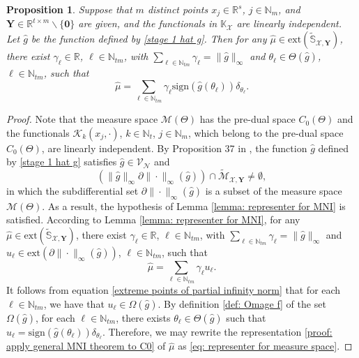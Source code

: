 \documentclass[11pt]{article}
\newtheorem{proposition}[theorem]{Proposition}
\begin{document}
\begin{proposition}\label{prop: representer theorem for MNI  in measure space}
Suppose that $m$ distinct points $x_j\in\mathbb{R}^s$, $j\in\mathbb{N}_m$, and $\mathbf{Y}\in\mathbb{R}^{t\times m}\backslash\{\mathbf{0}\}$ are given, and the functionals in $\mathbb{K}_\mathcal{X}$ are linearly independent. 
%
Let $\hat g$ be the function defined by \eqref{stage 1 hat g}. Then for any $\hat \mu\in\mathrm{ext}\left(\widetilde{\mathbb{S}}_{\mathcal{X},\mathbf{Y}}\right)$, there exist $\gamma_\ell\in\mathbb{R}$, $\ell\in\mathbb{N}_{tm}$, with  $\sum_{\ell\in\mathbb{N}_{tm}}\gamma_\ell=\|\hat g\|_{\infty}$ and $\theta_\ell\in\Theta(\hat g)$, $\ell\in\mathbb{N}_{tm}$, such that 
    \begin{equation}\label{eq: representer for measure space}
        \hat\mu=\sum\limits_{\ell\in\mathbb{N}_{tm}}\gamma_\ell\mathrm{sign}(\hat g(\theta_\ell))\delta_{\theta_\ell}.
    \end{equation}
\end{proposition}
\begin{proof}
Note that the measure space $\mathcal{M}(\Theta)$ has the pre-dual space $C_0(\Theta)$  and the functionals $\mathcal{K}_k(x_j,\cdot)$, $k\in\mathbb{N}_t$, $j\in\mathbb{N}_m$, which belong to the pre-dual space $C_0(\Theta)$, are linearly independent. By Proposition 37 in \cite{wang2023sparse},  the function $\hat g$ defined by \eqref{stage 1 hat g} satisfies $\hat g\in\mathcal{V}_{\mathcal{N}}$ and
\begin{equation*}\label{non empty set: BN case tilde}
(\|\hat g\|_{\infty}\partial\|\cdot\|_\infty(\hat g))\cap{\widetilde{\mathcal{M}}}_{\mathcal{X},\mathbf{Y}}\neq\emptyset,
\end{equation*} 
in which the subdifferential set $\partial\|\cdot\|_\infty(\hat g)$ is a subset of the measure space $\mathcal{M}(\Theta)$. As a result, the hypothesis of Lemma \ref{lemma: representer for MNI} is satisfied. According to Lemma \ref{lemma: representer for MNI}, for any $\hat \mu\in\mathrm{ext}\left(\widetilde{\mathbb{S}}_{\mathcal{X},\mathbf{Y}}\right)$, there exist $\gamma_\ell\in\mathbb{R}$, $\ell\in\mathbb{N}_{tm}$, with  $\sum_{\ell\in\mathbb{N}_{tm}}\gamma_\ell=\|\hat g\|_{\infty}$ and $u_\ell\in\mathrm{ext}(\partial \|\cdot\|_\infty(\hat g))$, $\ell\in\mathbb{N}_{tm}$, such that 
\begin{equation}\label{proof: apply general MNI theorem to C0}
\hat\mu=\sum_{\ell\in\mathbb{N}_{tm}}\gamma_\ell u_\ell.  
\end{equation}
It follows from equation \eqref{extreme points of partial infinity norm} that for each $\ell\in\mathbb{N}_{tm}$, we have that $u_\ell\in \Omega(\hat{g})$. By definition \eqref{def: Omage f} of the set $\Omega(\hat{g})$, for each $\ell\in\mathbb{N}_{tm}$, there exists $\theta_\ell\in\Theta(\hat g)$ such that $u_\ell=\mathrm{sign}(\hat g(\theta_\ell))\delta_{\theta_\ell}$. Therefore, we may rewrite the representation \eqref{proof: apply general MNI theorem to C0} of $\hat{\mu}$ as \eqref{eq: representer for measure space}. 
%
%
%
%
%
\end{proof}
\end{document}
